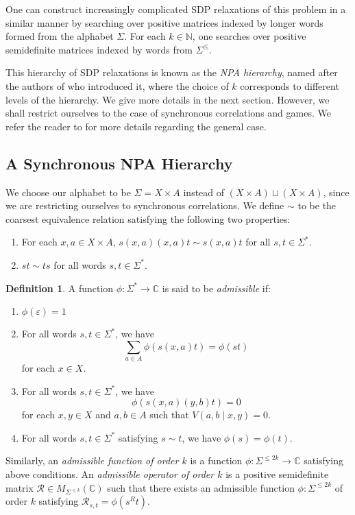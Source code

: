 \documentclass[11pt,a4paper]{article}
\theoremstyle{plain}
\theoremstyle{remark}
\theoremstyle{definition}
\newtheorem{definition}[thm]{Definition}
\renewcommand\epsilon\varepsilon
\begin{document}
One can construct increasingly complicated SDP relaxations of this problem in a similar manner by searching over positive matrices indexed by longer words formed from the alphabet $\Sigma$. For each $k \in \mathbb{N}$, one searches over positive semidefinite matrices indexed by words from $\Sigma^{\leq}$.

This hierarchy of SDP relaxations is known as the \emph{NPA hierarchy}, named after the authors of \cite{Navascues_2008} who introduced it, where the choice of $k$ corresponds to different levels of the hierarchy. We give more details in the next section. However, we shall restrict ourselves to the case of synchronous correlations and games. We refer the reader to \cite{Navascues_2008} for more details regarding the general case. 

\subsection{A Synchronous NPA Hierarchy}

We choose our alphabet to be $\Sigma = X \times A$ instead of $(X \times A) \sqcup (X\times A)$, since we are restricting ourselves to synchronous correlations. We define $\sim$ to be the coarsest equivalence relation satisfying the following two properties: \begin{enumerate}
    \item For each $x,a \in X \times A$, $s(x,a)(x,a)t \sim s(x,a)t$ for all $s,t \in \Sigma^*$.\item $st \sim ts$ for all words $s,t \in \Sigma^*$. \end{enumerate}

\begin{definition}
A function $\phi: \Sigma^* \to \mathbb{C}$ is said to be \emph{admissible} if:
\begin{enumerate}
    \item $\phi(\epsilon) = 1$
    \item For all words $s,t \in \Sigma^*$, we have 
    $$\sum_{a \in A}\phi(s(x,a)t) = \phi(st)$$
    for each $x \in X$.
    \item For all words $s,t \in \Sigma^*$, we have 
    $$\phi(s(x,a)(y,b)t) = 0$$
    for each $x,y \in X$ and $a,b \in A$ such that $V(a,b\mid x,y) = 0$.
    \item For all words $s,t \in \Sigma^*$ satisfying $s \sim t$, we have $\phi(s) = \phi(t)$.
\end{enumerate}

Similarly, an \emph{admissible function of order $k$} is a function $\phi: \Sigma^{\leq 2k} \to \mathbb{C}$ satisfying above conditions. An \emph{admissible operator of order $k$} is a positive semidefinite matrix $\mathcal{R} \in M_{\Sigma^{\leq k}}(\mathbb{C})$ such that there exists an admissible function $\phi: \Sigma^{\leq 2k}$ of order $k$ satisfying $\mathcal{R}_{s,t} = \phi(s^Rt).$ 
\end{definition}
\end{document}
